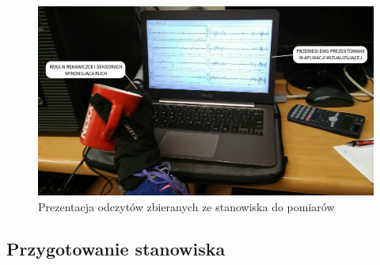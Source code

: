 \documentclass{article}
\begin{document}
\begin{figure}[H]
	\centering
	\includegraphics[width=16cm]{rekawiczka_aplikacja.png}
	\caption{Prezentacja odczytów zbieranych ze stanowiska do pomiarów}
	\label{rys:stanowisko}
\end{figure}

\subsection{Przygotowanie stanowiska}
\end{document}
